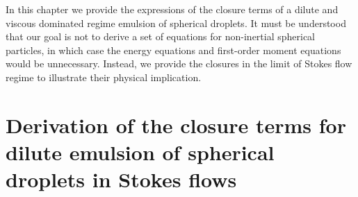 

In this chapter we provide the expressions of the closure terms of a dilute and viscous dominated regime emulsion of spherical droplets. 
It must be understood that our goal is not to derive a set of equations for non-inertial spherical particles, in which case the energy equations and first-order moment equations would be unnecessary. 
Instead, we provide the closures in the limit of Stokes flow regime to illustrate their physical implication. 

\section{Derivation of the closure terms for dilute emulsion of spherical droplets in Stokes flows}
\label{sec:application}





